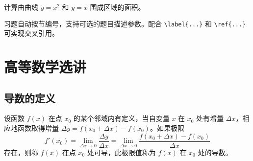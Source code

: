 \documentclass{harryopo-mathnotes}
\begin{document}
\begin{exercise}[积分求面积]
  计算由曲线 $y=x^2$ 和 $y=x$ 围成区域的面积。
\end{exercise}

习题自动按节编号，支持可选的题目描述参数。配合 \texttt{\textbackslash label\{...\}} 和 \texttt{\textbackslash ref\{...\}} 可实现交叉引用。

\section{高等数学选讲}

\subsection{导数的定义}


\begin{formal}
\begin{definition}[导数]\label{def:derivative}
设函数 $f(x)$ 在点 $x_0$ 的某个邻域内有定义，当自变量 $x$ 在 $x_0$ 处有增量 $\Delta x$，相应地函数取得增量 $\Delta y=f(x_0+\Delta x)-f(x_0)$。如果极限
$$f'(x_0)=\lim_{\Delta x\to 0}\frac{\Delta y}{\Delta x}
  =\lim_{\Delta x\to 0}\frac{f(x_0+\Delta x)-f(x_0)}{\Delta x}$$
存在，则称 $f(x)$ 在点 $x_0$ 处可导，此极限值称为 $f(x)$ 在 $x_0$ 处的导数。
\end{definition}
\end{formal}

\end{document}

